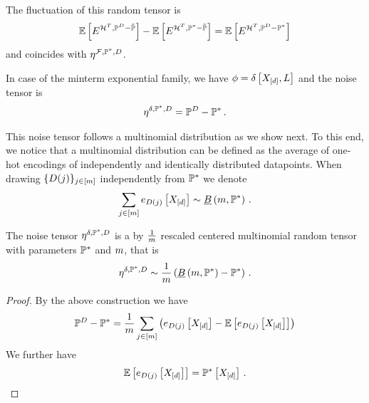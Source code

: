The fluctuation of this random tensor is
\begin{align*}
    \mathbb{E}\left[E^{\mathcal{H}^T,\mathbb{P}^{D}-\tilde{\mathbb{P}}}\right]  - \mathbb{E}\left[E^{\mathcal{H}^T,\mathbb{P}^*-\tilde{\mathbb{P}}}\right]
    = \mathbb{E}\left[E^{\mathcal{H}^T,\mathbb{P}^{D}-\mathbb{P}^*}\right]
\end{align*}
and coincides with $\eta^{\mathcal{F},\mathbb{P}^*,D}$.



In case of the minterm exponential family, we have $\phi=\delta\left[X_{[d]},L\right]$ and the noise tensor is
\begin{align*}
    \eta^{\delta,\mathbb{P}^*,D} = \mathbb{P}^{D} - \mathbb{P}^* \, .
\end{align*}

This noise tensor follows a multinomial distribution as we show next.
To this end, we notice that a multinomial distribution can be defined as the average of one-hot encodings of independently and identically distributed datapoints.
When drawing $\{D(j)\}_{j\in[m]}$ independently from $\mathbb{P}^*$ we denote
\begin{align*}
    \sum_{j\in[m]}e_{D(j)}\left[X_{[d]}\right]
    \sim \underline{B}\left(m,\mathbb{P}^*\right) \, .
\end{align*}

\begin{theorem}
    \label{the:multinomialEmpdistFluctuation}
    The noise tensor $\eta^{\delta,\mathbb{P}^*,D}$ is a by $\frac{1}{m}$ rescaled centered multinomial random tensor with parameters $\mathbb{P}^*$ and $m$, that is
    \begin{align*}
        \eta^{\delta,\mathbb{P}^*,D} \sim \frac{1}{m} \left( \underline{B}\left(m,\mathbb{P}^*\right) - \mathbb{P}^* \right) \, .
    \end{align*}
\end{theorem}
\begin{proof}
    By the above construction we have
    \begin{align*}
        \mathbb{P}^{D} - \mathbb{P}^*
        = \frac{1}{m}\sum_{j\in[m]} \left( e_{D(j)}\left[X_{[d]}\right] - \mathbb{E}\left[e_{D(j)}\left[X_{[d]}\right]\right] \right)
    \end{align*}
    We further have
    \begin{align*}
        \mathbb{E}\left[e_{D(j)}\left[X_{[d]}\right]\right] = \mathbb{P}^*\left[X_{[d]}\right] \, .
    \end{align*}
\end{proof}

